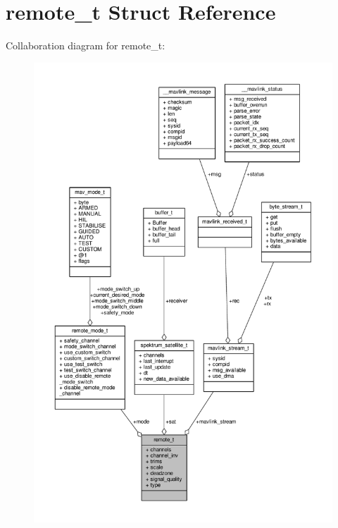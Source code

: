 \hypertarget{structremote__t}{\section{remote\+\_\+t Struct Reference}
\label{structremote__t}
}


Collaboration diagram for remote\+\_\+t\+:
\nopagebreak
\begin{figure}[H]
\begin{center}
\leavevmode
\includegraphics[width=350pt]{structremote__t__coll__graph}
\end{center}
\end{figure}
